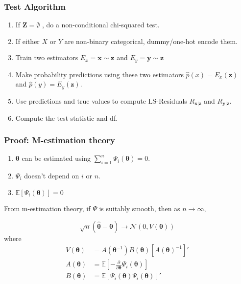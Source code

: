 \documentclass{beamer}
\begin{document}
\begin{frame}
	\frametitle{Test Algorithm}
	\begin{enumerate}
		\setlength\itemsep{1em}
		\item If $\mathbf{Z} = \emptyset $ , do a non-conditional chi-squared test.
		\item If either $ X $ or $ Y $ are non-binary categorical,
			dummy/one-hot encode them.
		\item Train two estimators $ E_x = \bm{x} \sim \bm{z} $ and
			$ E_y = \bm{y} \sim \bm{z} $
		\item Make probability predictions using these two estimators 
			$ \hat{p}(x) = E_x(\bm{z}) $ and $ \hat{p}(y) =
			E_y(\bm{\bm{z}}) $.
		\item Use predictions and true values to compute LS-Residuals $ R_{\bm{x}|\bm{z}} $ and $ R_{\bm{y}|\bm{z}} $.	
		\item Compute the test statistic and df.
	\end{enumerate}
\end{frame}

\begin{frame}
	\frametitle{Proof: M-estimation theory}
	\begin{enumerate}
		\item $ \bm{\theta} $ can be estimated using $ \sum_{i=1}^n \Psi_i(\bm{\theta}) = 0 $.
		\item $ \Psi_i $ doesn't depend on $ i $ or $ n $.
		\item $ \mathbb{E}[\Psi_i(\bm{\theta})] = 0 $
	\end{enumerate}

	From m-estimation theory, if $ \Psi $ is suitably smooth, then as $ n \to \infty $,

	$$ \sqrt{n}(\hat{\bm{\theta}} - \bm{\theta}) \to \mathcal{N}(0, V(\bm{\theta})) $$
	where 
	\begin{equation*}
		\begin{split}
			V(\bm{\theta}) &= A(\bm{\theta}^{-1}) B(\bm{\theta})[A(\bm{\theta})^{-1}]' \\
			A(\bm{\theta}) &= \mathbb{E} \left[ - \frac{\partial}{\partial \bm{\theta}} \Psi_i(\bm{\theta}) \right] \\ 
			B(\bm{\theta}) &= \mathbb{E}[\Psi_i(\bm{\theta}) \Psi_i(\bm{\theta})]'
		\end{split}
	\end{equation*}

\end{frame}
\end{document}
